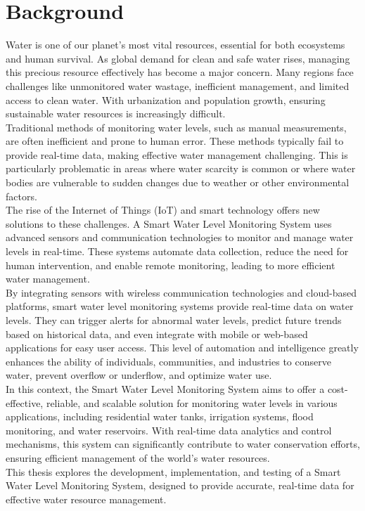 \section{Background}
{\fontsize{12}{14}\selectfont
Water is one of our planet’s most vital resources, essential for both ecosystems and human survival. As global demand for clean and safe water rises, managing this precious resource effectively has become a major concern. Many regions face challenges like unmonitored water wastage, inefficient management, and limited access to clean water. With urbanization and population growth, ensuring sustainable water resources is increasingly difficult.\\

\noindent
Traditional methods of monitoring water levels, such as manual measurements, are often inefficient and prone to human error. These methods typically fail to provide real-time data, making effective water management challenging. This is particularly problematic in areas where water scarcity is common or where water bodies are vulnerable to sudden changes due to weather or other environmental factors.\\

\noindent
The rise of the Internet of Things (IoT) and smart technology offers new solutions to these challenges. A Smart Water Level Monitoring System uses advanced sensors and communication technologies to monitor and manage water levels in real-time. These systems automate data collection, reduce the need for human intervention, and enable remote monitoring, leading to more efficient water management.\\

\noindent
By integrating sensors with wireless communication technologies and cloud-based platforms, smart water level monitoring systems provide real-time data on water levels. They can trigger alerts for abnormal water levels, predict future trends based on historical data, and even integrate with mobile or web-based applications for easy user access. This level of automation and intelligence greatly enhances the ability of individuals, communities, and industries to conserve water, prevent overflow or underflow, and optimize water use.\\

\noindent
In this context, the Smart Water Level Monitoring System aims to offer a cost-effective, reliable, and scalable solution for monitoring water levels in various applications, including residential water tanks, irrigation systems, flood monitoring, and water reservoirs. With real-time data analytics and control mechanisms, this system can significantly contribute to water conservation efforts, ensuring efficient management of the world’s water resources.\\

\noindent
This thesis explores the development, implementation, and testing of a Smart Water Level Monitoring System, designed to provide accurate, real-time data for effective water resource management. 
} 

